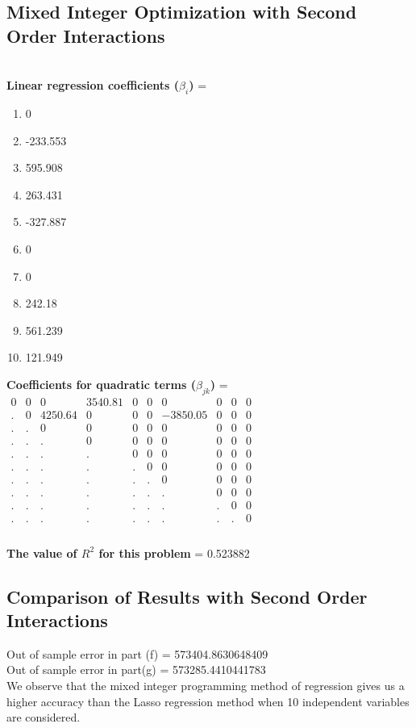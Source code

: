 \documentclass[15pt,a4paper,openright]{article}
\begin{document}
\subsection{Mixed Integer Optimization with Second Order Interactions}
\\\textbf{Linear regression coefficients ($\beta_{i}$)} =
\begin{enumerate}
   \item 0
\item -233.553
\item 595.908
\item 263.431
\item -327.887 
\item 0
\item 0
\item 242.18 
\item 561.239
\item 121.949
\end{enumerate}
\textbf{Coefficients for quadratic terms ($\beta_{jk}$)} = 
\\$\begin{matrix}
0&0&0&3540.81&0&0&0&0&0&0\\
.&0&4250.64&0&0&0&-3850.05&0&0&0\\
.&.&0&0&0&0&0&0&0&0\\
.&.&.&0&0&0&0&0&0&0\\
.&.&.&.&0&0&0&0&0&0\\
.&.&.&.&.&0&0&0&0&0\\
.&.&.&.&.&.&0&0&0&0\\
.&.&.&.&.&.&.&0&0&0\\
.&.&.&.&.&.&.&.&0&0\\
.&.&.&.&.&.&.&.&.&0\\
\end{matrix}$
\\\\\textbf{The value of $R^{2}$ for this problem} = 0.523882

\newpage{}
\subsection{Comparison of Results with Second Order Interactions}
Out of sample error in part (f) = 573404.8630648409
\\Out of sample error in part(g) = 573285.4410441783
\\We observe that the mixed integer programming method of regression gives us a higher accuracy than the Lasso regression method when 10 independent variables are considered.
\newpage{}
\end{document}
